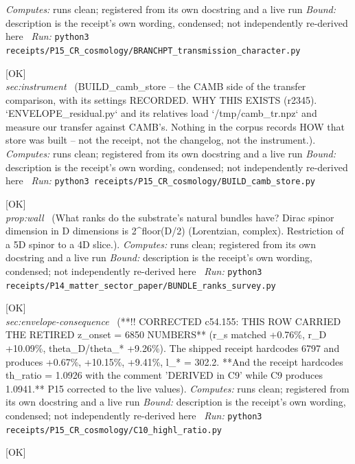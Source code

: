 \begin{description}
\emph{Computes:} runs clean; registered from its own docstring and a live run
 \emph{Bound:} description is the receipt's own wording, condensed; not independently re-derived here
\ \emph{Run:} \texttt{python3 receipts/P15\_CR\_cosmology/BRANCHPT\_transmission\_character.py}
\item[\label{rcpt:BUILD_camb_store}\texttt{BUILD\_camb\_store}]\hfill\textsf{[OK]}\\
\textit{sec:instrument} \ (BUILD\_camb\_store -- the CAMB side of the transfer comparison, with its settings RECORDED. WHY THIS EXISTS (r2345). `ENVELOPE\_residual.py` and its relatives load `/tmp/camb\_tr.npz` and measure our transfer against CAMB's. Nothing in the corpus records HOW that store was built -- not the receipt, not the changelog, not the instrument.). 
\emph{Computes:} runs clean; registered from its own docstring and a live run
 \emph{Bound:} description is the receipt's own wording, condensed; not independently re-derived here
\ \emph{Run:} \texttt{python3 receipts/P15\_CR\_cosmology/BUILD\_camb\_store.py}
\item[\label{rcpt:BUNDLE_ranks_survey}\texttt{BUNDLE\_ranks\_survey}]\hfill\textsf{[OK]}\\
\textit{prop:wall} \ (What ranks do the substrate's natural bundles have? Dirac spinor dimension in D dimensions is 2\textasciicircum{}floor(D/2) (Lorentzian, complex). Restriction of a 5D spinor to a 4D slice.). 
\emph{Computes:} runs clean; registered from its own docstring and a live run
 \emph{Bound:} description is the receipt's own wording, condensed; not independently re-derived here
\ \emph{Run:} \texttt{python3 receipts/P14\_matter\_sector\_paper/BUNDLE\_ranks\_survey.py}
\item[\label{rcpt:C10_highl_ratio}\texttt{C10\_highl\_ratio}]\hfill\textsf{[OK]}\\
\textit{sec:envelope-consequence} \ (**!! CORRECTED c54.155: THIS ROW CARRIED THE RETIRED z\_onset = 6850 NUMBERS** (r\_s matched +0.76\%, r\_D +10.09\%, theta\_D/theta\_* +9.26\%). The shipped receipt hardcodes 6797 and produces +0.67\%, +10.15\%, +9.41\%, l\_* = 302.2. **And the receipt hardcodes th\_ratio = 1.0926 with the comment 'DERIVED in C9' while C9 produces 1.0941.** P15 corrected to the live values). 
\emph{Computes:} runs clean; registered from its own docstring and a live run
 \emph{Bound:} description is the receipt's own wording, condensed; not independently re-derived here
\ \emph{Run:} \texttt{python3 receipts/P15\_CR\_cosmology/C10\_highl\_ratio.py}
\item[\label{rcpt:C11TEST_radiation_zeroed}\texttt{C11TEST\_radiation\_zeroed}]\hfill\textsf{[OK]}\\

\end{description}
